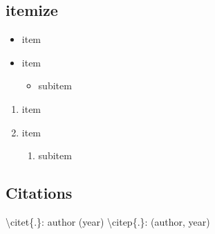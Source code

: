 \documentclass[a4paper, 11pt]{article}
\begin{document}
\subsection{itemize}

\begin{itemize}[noitemsep]
	\item item
	\item item
	\begin{itemize}
		\item subitem
	\end{itemize}
\end{itemize}

\begin{enumerate}
	\item item
	\item item
	\begin{enumerate}
		\item subitem
	\end{enumerate}
\end{enumerate}

\subsection{Citations}
\textbackslash citet\{.\}: author (year)
\textbackslash citep\{.\}: (author, year)


\end{document}
